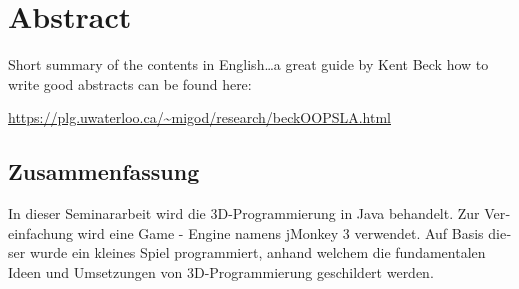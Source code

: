 \begingroup
\let\clearpage\relax
\let\cleardoublepage\relax
\let\cleardoublepage\relax


\ifx\myLanguage\english

\chapter*{Abstract}
Short summary of the contents in English\dots a great guide by 
Kent Beck how to write good abstracts can be found here:  
\begin{center}
\url{https://plg.uwaterloo.ca/~migod/research/beckOOPSLA.html}
\end{center}

\vfill

\fi

\begin{otherlanguage}{ngerman}
\chapter*{Zusammenfassung}
In dieser Seminararbeit wird die 3D-Programmierung in Java behandelt. Zur Vereinfachung wird eine Game - Engine namens jMonkey 3 verwendet.
Auf Basis dieser wurde ein kleines Spiel programmiert, anhand welchem die fundamentalen Ideen und Umsetzungen von 3D-Programmierung geschildert werden.
\end{otherlanguage}

\endgroup			

\vfill